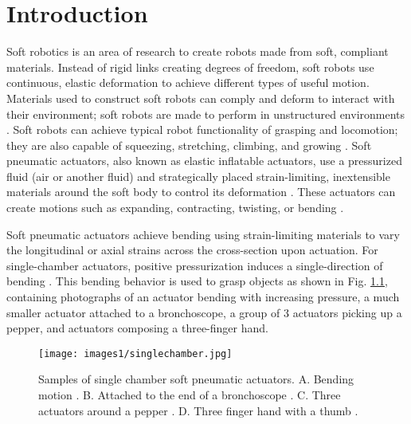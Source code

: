 \chapter{Introduction}

Soft robotics is an area of research to create robots made from soft, compliant materials. Instead of rigid links creating degrees of freedom, soft robots use continuous, elastic deformation to achieve different types of useful motion. Materials used to construct soft robots can comply and deform to interact with their environment; soft robots are made to perform in unstructured environments \cite{lee_soft_2017}. Soft robots can achieve typical robot functionality of grasping and locomotion; they are also capable of squeezing, stretching, climbing, and growing \cite{laschi_soft_2016}. Soft pneumatic actuators, also known as elastic inflatable actuators, use a pressurized fluid (air or another fluid) and strategically placed strain-limiting, inextensible materials around the soft body to control its deformation \cite{zaidi_actuation_2021}. These actuators can create motions such as expanding, contracting, twisting, or bending \cite{gorissen_elastic_2017, al-ibadi_circular_2018}. 

Soft pneumatic actuators achieve bending using strain-limiting materials to vary the longitudinal or axial strains across the cross-section upon actuation. For single-chamber actuators, positive pressurization induces a single-direction of bending \cite{galloway_mechanically_2013,  mccandless_soft_2022, alici_modeling_2018, sundaram_dragonclaw_2023}. This bending behavior is used to grasp objects as shown in Fig. \ref{fig:singlechamber}, containing photographs of an actuator bending with increasing pressure, a much smaller actuator attached to a bronchoscope, a group of 3 actuators picking up a pepper, and actuators composing a three-finger hand. \\

\begin{figure}[!ht]
    \centering
    \texttt{[image: images1/singlechamber.jpg]}
    \caption{Samples of single chamber soft pneumatic actuators. A. Bending motion \cite{galloway_mechanically_2013}. B. Attached to the end of a bronchoscope \cite{mccandless_soft_2022}. C. Three actuators around a pepper \cite{alici_modeling_2018}. D. Three finger hand with a thumb \cite{sundaram_dragonclaw_2023}.}
    \label{fig:singlechamber}
\end{figure}

